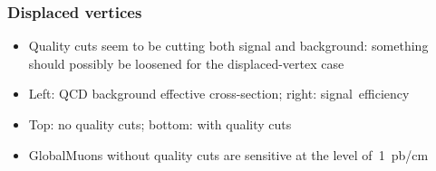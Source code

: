 \documentclass[compress]{beamer}
\begin{document}
\begin{frame}
\frametitle{Displaced vertices}
\begin{itemize}
\item Quality cuts seem to be cutting both signal and background:
  something should possibly be loosened for the displaced-vertex case
\item Left: QCD background effective cross-section; right: \mbox{signal efficiency\hspace{-1 cm}}
\item Top: no quality cuts; bottom: with quality cuts
\item<2> GlobalMuons without quality cuts are sensitive at the level \mbox{of 1~pb/cm\hspace{-1 cm}}
\end{itemize}

\begin{center}
\end{center}
\end{frame}
\end{document}
